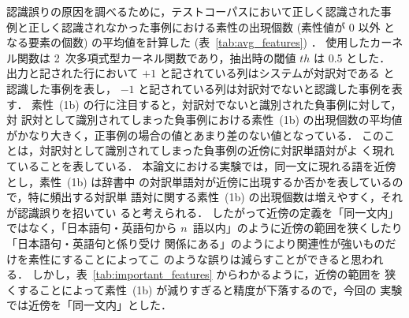 認識誤りの原因を調べるために，テストコーパスにおいて正しく認識された事
例と正しく認識されなかった事例における素性の出現個数 (素性値が 0 以外
となる要素の個数) の平均値を計算した (表~\ref{tab:avg_features}) ．
使用したカーネル関数は 2~次多項式型カーネル関数であり，抽出時の閾値 $th$
は 0.5 とした．
出力と記された行において $+1$ と記されている列はシステムが対訳対である
と認識した事例を表し，
$-1$ と記されている列は対訳対でないと認識した事例を表す．
素性~(1b) の行に注目すると，対訳対でないと識別された負事例に対して，対
訳対として識別されてしまった負事例における素性~(1b) の出現個数の平均値
がかなり大きく，正事例の場合の値とあまり差のない値となっている．
このことは，対訳対として識別されてしまった負事例の近傍に対訳単語対がよ
く現れていることを表している．
本論文における実験では，同一文に現れる語を近傍とし，素性~(1b) は辞書中
の対訳単語対が近傍に出現するか否かを表しているので，特に頻出する対訳単
語対に関する素性~(1b) の出現個数は増えやすく，それが認識誤りを招いてい
ると考えられる．
したがって近傍の定義を「同一文内」ではなく，「日本語句・英語句から
$n$~語以内」のように近傍の範囲を狭くしたり「日本語句・英語句と係り受け
関係にある」のようにより関連性が強いものだけを素性にすることによってこ
のような誤りは減らすことができると思われる．
しかし，表~\ref{tab:important_features} からわかるように，近傍の範囲を
狭くすることによって素性~(1b) が減りすぎると精度が下落するので，今回の
実験では近傍を「同一文内」とした．
